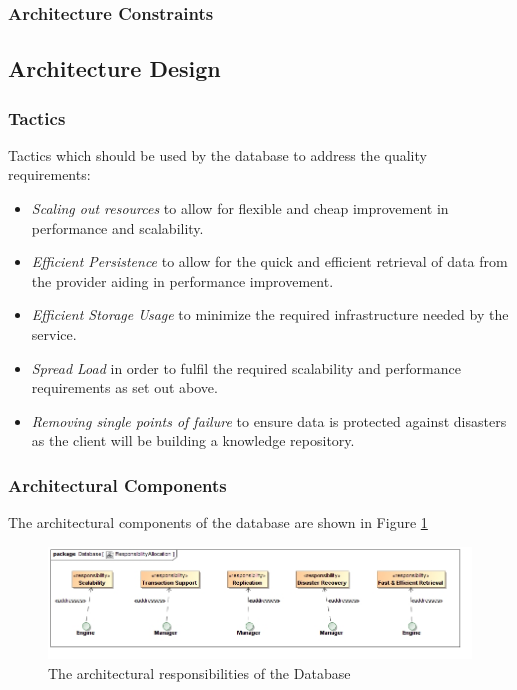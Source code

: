\subsubsection{Architecture Constraints}
\subsection{Architecture Design}
\subsubsection{Tactics}
Tactics which should be used by the database to address the quality requirements:
\begin{itemize}
	\item \textit{Scaling out resources} to allow for flexible and cheap
		improvement in performance and scalability.
	\item \textit{Efficient Persistence} to allow for the quick and efficient
		retrieval of data from the provider aiding in performance
		improvement.
	\item \textit{Efficient Storage Usage} to minimize the required
	infrastructure needed by the service.
	\item \textit{Spread Load} in order to fulfil the required scalability
		and performance requirements as set out above.
	\item \textit{Removing single points of failure} to ensure data is
		protected against disasters as the client will be building a
		knowledge repository.
\end{itemize}

\subsubsection{Architectural Components}
The architectural components of the database are shown in 
Figure \ref{fig:databaseResponsibilityAllocation}
\begin{figure}[H]
	\begin{center}
	\includegraphics[scale=0.5]{../Diagrams and Charts/Database/ResponsibilityAllocation.jpg}
	\caption{The architectural responsibilities of the Database}
	\label{fig:databaseResponsibilityAllocation}
	\end{center}
\end{figure}

